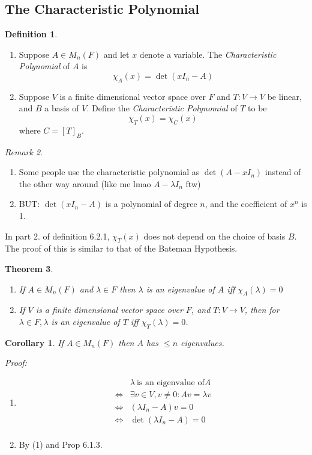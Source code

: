 \documentclass{report}
\newtheorem{theorem}{Theorem}[subsection]
\newtheorem*{corollary}{Corollary}
\theoremstyle{remark}
\newtheorem{remark}[theorem]{Remark}
\theoremstyle{definition}
\newtheorem{definition}[theorem]{Definition}
\theoremstyle{definition}
\theoremstyle{theorem}
\begin{document}
\subsection{The Characteristic Polynomial}
\begin{definition}
\begin{enumerate}
    \item Suppose $A \in M_n(F)$ and let $x$ denote a variable. The \emph{Characteristic Polynomial} of $A$ is
\[\chi_A(x) = \det(xI_n-A)\]
    \item Suppose $V$ is a finite dimensional vector space over $F$ and $T:V \rightarrow V$ be linear, and $B$ a basis of $V$. Define the \emph{Characteristic Polynomial} of $T$ to be
    \[\chi_T(x)=\chi_C(x)\]
    where $C = [T]_B$.
\end{enumerate}
\end{definition}
\begin{remark}
\begin{enumerate}
    \item Some people use the characteristic polynomial as $\det(A-xI_n)$ instead of the other way around (like me lmao $A-\lambda I_n$ ftw)
    \item BUT: $\det(xI_n-A)$ is a polynomial of degree $n$, and the coefficient of $x^n$ is 1.
\end{enumerate}
\end{remark}
In part 2. of definition 6.2.1, $\chi_T(x)$ does not depend on the choice of basis $B$. The proof of this is similar to that of the Bateman Hypothesis.
\begin{theorem}
\begin{enumerate}
    \item If $A \in M_n(F)$ and $\lambda \in F$ then $\lambda$ is an eigenvalue of $A$ iff $\chi_A(\lambda)=0$
    \item If $V$ is a finite dimensional vector space over $F$, and $T:V \rightarrow V$, then for $\lambda \in F, \lambda$ is an eigenvalue of $T$ iff $\chi_T(\lambda)=0$.
\end{enumerate}
\end{theorem}
\begin{corollary}
If $A \in M_n(F)$ then $A$ has $\leq n$ eigenvalues.
\end{corollary}
\emph{Proof:} 
\begin{enumerate}
    \item \begin{align*}
    &\lambda \> \text{is an eigenvalue of} A\\
    \iff& \exists v \in V, v\neq 0: Av=\lambda v\\
    \iff& (\lambda I_n-A)v = 0\\
    \iff& \det(\lambda I_n-A)=0\\
\end{align*}
    \item By (1) and Prop 6.1.3.
\end{enumerate}\par
\end{document}
